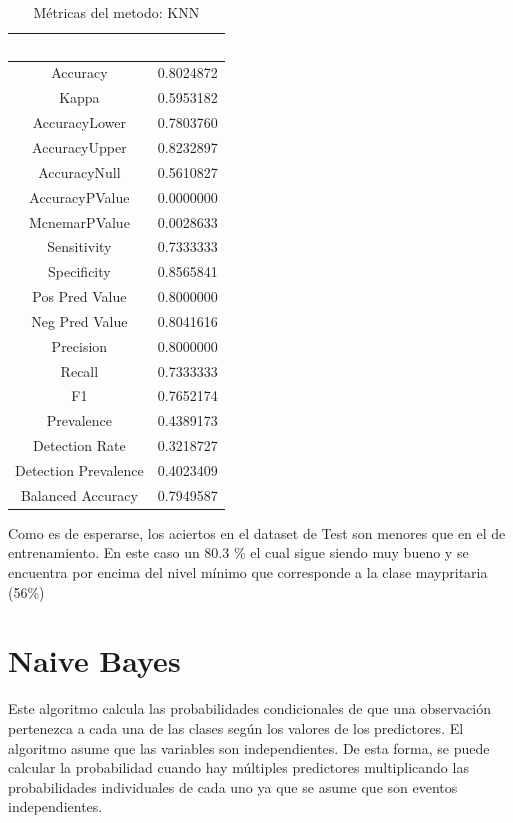 \documentclass[]{article}
\begin{document}
\begin{table}[!h]

\caption{\label{tab:metricas_KNN}Métricas del metodo: KNN }
\centering
\begin{tabular}[t]{cc}
\toprule
\rowcolor{black}  \multicolumn{1}{c}{\textcolor{white}{\textbf{metricas}}} & \multicolumn{1}{c}{\textcolor{white}{\textbf{valor}}}\\
\midrule
\rowcolor{gray!6}  Accuracy & 0.8024872\\
Kappa & 0.5953182\\
\rowcolor{gray!6}  AccuracyLower & 0.7803760\\
AccuracyUpper & 0.8232897\\
\rowcolor{gray!6}  AccuracyNull & 0.5610827\\
\addlinespace
AccuracyPValue & 0.0000000\\
\rowcolor{gray!6}  McnemarPValue & 0.0028633\\
Sensitivity & 0.7333333\\
\rowcolor{gray!6}  Specificity & 0.8565841\\
Pos Pred Value & 0.8000000\\
\addlinespace
\rowcolor{gray!6}  Neg Pred Value & 0.8041616\\
Precision & 0.8000000\\
\rowcolor{gray!6}  Recall & 0.7333333\\
F1 & 0.7652174\\
\rowcolor{gray!6}  Prevalence & 0.4389173\\
\addlinespace
Detection Rate & 0.3218727\\
\rowcolor{gray!6}  Detection Prevalence & 0.4023409\\
Balanced Accuracy & 0.7949587\\
\bottomrule
\end{tabular}
\end{table}

Como es de esperarse, los aciertos en el dataset de Test son menores que
en el de entrenamiento. En este caso un 80.3 \% el cual sigue siendo muy
bueno y se encuentra por encima del nivel mínimo que corresponde a la
clase maypritaria (56\%)

\hypertarget{naive-bayes}{%
\section{Naive Bayes}\label{naive-bayes}}

Este algoritmo calcula las probabilidades condicionales de que una
observación pertenezca a cada una de las clases según los valores de los
predictores. El algoritmo asume que las variables son independientes. De
esta forma, se puede calcular la probabilidad cuando hay múltiples
predictores multiplicando las probabilidades individuales de cada uno ya
que se asume que son eventos independientes.
\end{document}
